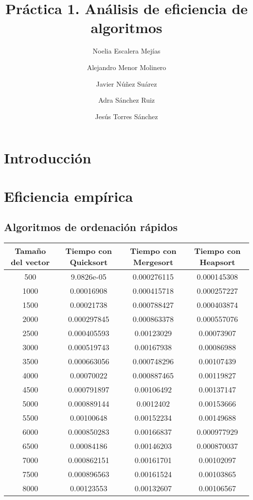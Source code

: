 \documentclass{article}
\title{Práctica 1. Análisis de eficiencia de algoritmos}
\author{Noelia Escalera Mejías \\
		\and Alejandro Menor Molinero \\
		\and Javier Núñez Suárez \\
		\and Adra Sánchez Ruiz \\
		\and Jesús Torres Sánchez}
\begin{document}
	\maketitle
	\section{Introducción}
	\section{Eficiencia empírica}
	\subsection{Algoritmos de ordenación rápidos}
		\begin{longtable}{|c|c|c|c|}
			\hline
			Tamaño del vector & Tiempo con Quicksort & Tiempo con Mergesort & Tiempo con Heapsort \\ \hline
			500	   &  9.0826e-05    & 	0.000276115	 &  0.000145308  \\ \hline
			1000   &  0.00016908    & 	0.000415718	 &  0.000257227  \\ \hline
			1500   &  0.00021738    & 	0.000788427	 &  0.000403874  \\ \hline
			2000   &  0.000297845   & 	0.000863378	 &  0.000557076  \\ \hline
			2500   &  0.000405593   & 	0.00123029	 &  0.00073907  \\ \hline
			3000   &  0.000519743   & 	0.00167938	 &  0.00086988  \\ \hline
			3500   &  0.000663056   & 	0.000748296	 &  0.00107439  \\ \hline
			4000   &  0.00070022    & 	0.000887465	 &  0.00119827  \\ \hline
			4500   &  0.000791897   & 	0.00106492	 &  0.00137147  \\ \hline
			5000   &  0.000889144   & 	0.0012402	 &  0.00153666  \\ \hline
			5500   &  0.00100648    & 	0.00152234	 &  0.00149688  \\ \hline
			6000   &  0.000850283   & 	0.00166837	 &  0.000977929  \\ \hline
			6500   &  0.00084186    & 	0.00146203	 &  0.000870037  \\ \hline
	    	7000   &  0.000862151   & 	0.00161701	 &  0.00102097  \\ \hline
		    7500   &  0.000896563   & 	0.00161524	 &  0.00103865  \\ \hline
		    8000   &  0.00123553    & 	0.00132607	 &  0.00106567  \\ \hline

\end{longtable}
\end{document}
